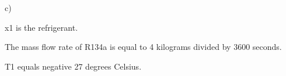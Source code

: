 c)

x1 is the refrigerant.

The mass flow rate of R134a is equal to 4 kilograms divided by 3600 seconds.

T1 equals negative 27 degrees Celsius.